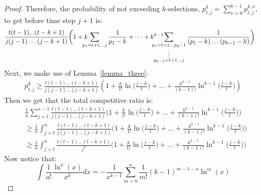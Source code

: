\begin{proof}
Therefore, the probability of not exceeding $k$-selections, $p_{t,j}^k =\sum_{\nu=0}^{k-1} p_{t,j}^{k,\nu} $, to get before time step $j + 1$ is:
\begin{align}
   \notag
    & \frac{t(t - 1)...(t - k + 1)}{j (j - 1) \dots (j - k + 1)} \bigg(1 + k\hspace{-1em}\sum_{p_1 = t + 1\dots j}^{}\frac{1}{p_1 - k} + \dots
    + {k^{k - 1}}\hspace{-2em}\sum_{\substack{p_1 = t + 1 \dots p_2 - 1  \\\vdots\\ p_{k-1} = t + 1 \dots j}}\frac{1}{(p_1 - k)\dots (p_{k-1} - k)} \bigg)%
\end{align}
Next, we make use of  
Lemma~\ref{lemma_three}:
\begin{align}
 p_{t,j}^{k} \geq 
     \frac{t(t - 1)\dots (t - k + 1)}{j(j - 1)\dots(j - k + 1)}\left(1 + \frac{k}{1!}\ln \Big(\frac{j - k}{t}\Big) +  \dots + \frac{k^{k - 1}}{(k-1)!}\ln^{k - 1}\Big(\frac{j - k}{t}\Big)\right)
\end{align}
Then we get that the total competitive ratio is: 
\begin{align}
     & \frac{1}{n}\sum_{j = t}^{n - 1}
     \frac{t(t - 1)\dots (t - k + 1)}{j(j - 1)\dots(j - k + 1)}\bigg(1 + \frac{k}{1!}\ln \Big(\frac{j - k}{t}\Big) +  \dots + \frac{k^{k - 1}}{(k-1)!}\ln^{k - 1}\Big(\frac{j - k}{t}\Big)\bigg)\\
     & \geq
     \frac{1}{n}\int_{j = t}^{n}
     \frac{t(t - 1)\dots (t - k + 1)}{j(j - 1)\dots(j - k + 1)}\bigg(1 + \frac{k}{1!}\ln \Big(\frac{j - k}{t}\Big) + \dots + \frac{k^{k - 1}}{(k-1)!}\ln^{k - 1}\Big(\frac{j - k}{t}\Big)\bigg)\\
     & \geq
     \frac{1}{n}\int_{j = t}^{n}
     \frac{t(t - 1)\dots (t - k + 1)}{j^k}\bigg(1 + \frac{k}{1!}\ln \Big(\frac{j - k}{t}\Big) + \dots + \frac{k^{k - 1}}{(k-1)!}\ln^{k - 1}\Big(\frac{j - k}{t}\Big)\bigg)
\end{align}
Now notice that:
\begin{equation}
    \label{identity_two}
    \int\frac{1}{a!} \frac{\ln^a(x)}{x^k} dx = - \frac{1}{x^{k - 1}}\sum_{m = 0}^{a}\frac{1}{m!}(k -1)^{m - 1 -a }\ln^m(x)

\end{equation}
\end{proof}
